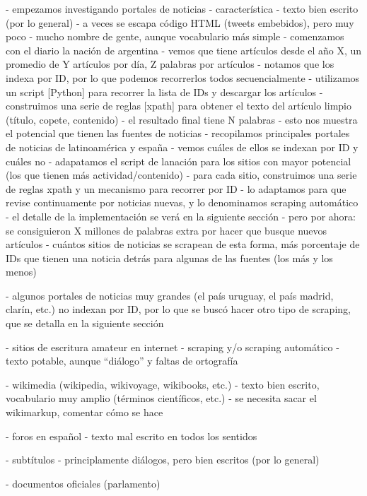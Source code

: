- empezamos investigando portales de noticias
    - característica
        - texto bien escrito (por lo general)
        - a veces se escapa código HTML (tweets embebidos), pero muy poco
        - mucho nombre de gente, aunque vocabulario más simple
    - comenzamos con el diario la nación de argentina
    - vemos que tiene artículos desde el año X, un promedio de Y artículos por día, Z palabras por artículos
    - notamos que los indexa por ID, por lo que podemos recorrerlos todos secuencialmente
    - utilizamos un script [Python] para recorrer la lista de IDs y descargar los artículos
    - construimos una serie de reglas [xpath] para obtener el texto del artículo limpio (título, copete, contenido)
    - el resultado final tiene N palabras
    - esto nos muestra el potencial que tienen las fuentes de noticias
    - recopilamos principales portales de noticias de latinoamérica y españa
    - vemos cuáles de ellos se indexan por ID y cuáles no
    - adapatamos el script de lanación para los sitios con mayor potencial (los que tienen más actividad/contenido)
    - para cada sitio, construimos una serie de reglas xpath y un mecanismo para recorrer por ID
    - lo adaptamos para que revise continuamente por noticias nuevas, y lo denominamos scraping automático
    - el detalle de la implementación se verá en la siguiente sección
    - pero por ahora: se consiguieron X millones de palabras extra por hacer que busque nuevos artículos
    - cuántos sitios de noticias se scrapean de esta forma, más porcentaje de IDs que tienen una noticia
      detrás para algunas de las fuentes (los más y los menos)

- algunos portales de noticias muy grandes (el país uruguay, el país madrid, clarín, etc.) no indexan por ID,
  por lo que se buscó hacer otro tipo de scraping, que se detalla en la siguiente sección

- sitios de escritura amateur en internet
    - scraping y/o scraping automático
    - texto potable, aunque ``diálogo'' y faltas de ortografía

- wikimedia (wikipedia, wikivoyage, wikibooks, etc.)
    - texto bien escrito, vocabulario muy amplio (términos científicos, etc.)
    - se necesita sacar el wikimarkup, comentar cómo se hace

- foros en español
    - texto mal escrito en todos los sentidos

- subtítulos
    - principlamente diálogos, pero bien escritos (por lo general)

- documentos oficiales (parlamento)

